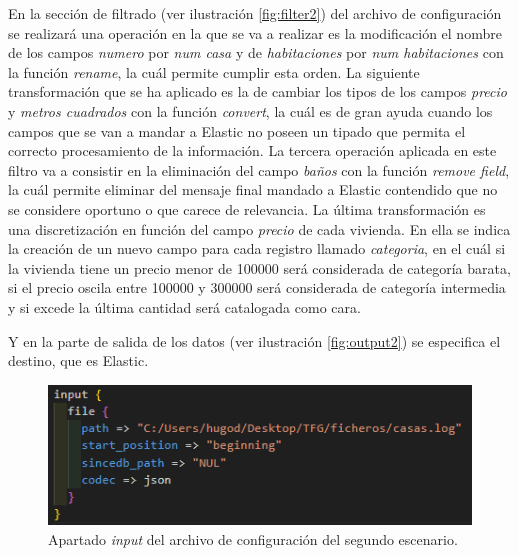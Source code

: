 En la sección de filtrado  (ver ilustración  \ref{fig:filter2}) del archivo de configuración se realizará una operación en la que se va a realizar es la modificación el nombre de los campos \textit{numero} por \textit{num casa} y de \textit{habitaciones} por \textit{num habitaciones} con la función \textit{rename}, la cuál permite cumplir esta orden. La siguiente transformación que se ha aplicado es la de cambiar los tipos de los campos \textit{precio} y \textit{metros cuadrados} con la función \textit{convert}, la cuál es de gran ayuda cuando los campos que se van a mandar a Elastic no poseen un tipado que permita el correcto procesamiento de la información. La tercera operación aplicada en este filtro va a consistir en la eliminación del campo \textit{baños} con la función \textit{remove field}, la cuál permite eliminar del mensaje final mandado a Elastic contendido que no se considere oportuno o que carece de relevancia. La última transformación es una discretización en función del campo \textit{precio} de cada vivienda. En ella se indica la creación de un nuevo campo para cada registro llamado \textit{categoria}, en el cuál si la vivienda tiene un precio menor de 100000 será considerada de categoría barata, si el precio oscila entre 100000 y 300000 será considerada de categoría intermedia y si excede la última cantidad será catalogada como cara.

Y en la parte de salida de los datos  (ver ilustración  \ref{fig:output2}) se especifica el destino, que es Elastic.

\begin{figure}
    \centering
    \includegraphics[width=1\linewidth]{img/input2.png}
    \caption{Apartado \textit{input} del archivo de configuración del segundo escenario.}
    \label{fig:input2}
\end{figure}

